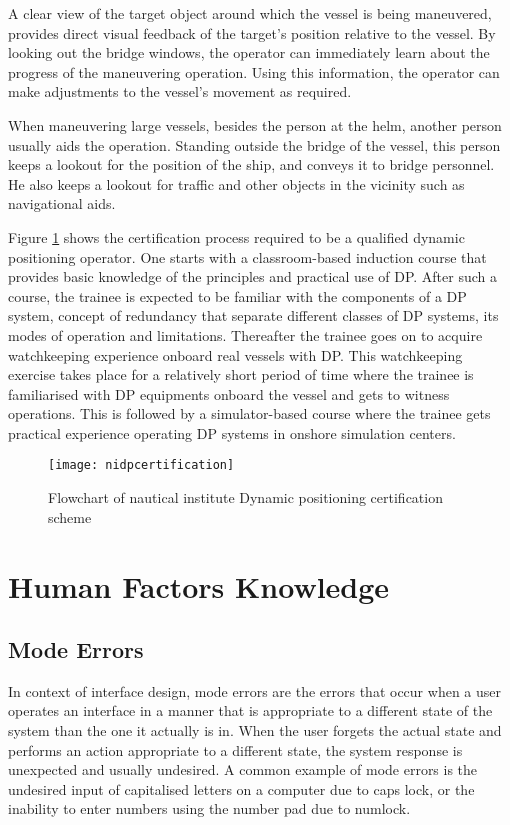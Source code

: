A clear view of the target object around which the vessel is being maneuvered, provides direct visual feedback of the target’s position relative to the vessel. By looking out the bridge windows, the operator can immediately learn about the progress of the maneuvering operation. Using this information, the operator can make adjustments to the vessel's movement as required.

When maneuvering large vessels, besides the person at the helm, another person usually aids the operation. Standing outside the bridge of the vessel, this person keeps a lookout for the position of the ship, and conveys it to bridge personnel. He also keeps a lookout for traffic and other objects in the vicinity such as navigational aids.

Figure \ref{fig:nidpcertification} shows the certification process required to be a qualified dynamic positioning operator. One starts with a classroom-based induction course that provides basic knowledge of the principles and practical use of DP. After such a course, the trainee is expected to be familiar with the components of a DP system, concept of redundancy that separate different classes of DP systems, its modes of operation and limitations. Thereafter the trainee goes on to acquire watchkeeping experience onboard real vessels with DP. This watchkeeping exercise takes place for a relatively short period of time where the trainee is familiarised with DP equipments onboard the vessel and gets to witness operations. This is followed by a simulator-based course where the trainee gets practical experience operating DP systems in onshore simulation centers. 

\begin{figure}
	\centering
	\texttt{[image: nidpcertification]}
	\caption{Flowchart of nautical institute Dynamic positioning certification scheme}
	\label{fig:nidpcertification}
\end{figure} 

\section{Human Factors Knowledge}
\label{sec:humanfactors}
\subsection{Mode Errors}
In context of interface design, mode errors are the errors that occur when a user operates an interface in a manner that is appropriate to a different state of the system than the one it actually is in. When the user forgets the actual state and performs an action appropriate to a different state, the system response is unexpected and usually undesired. A common example of mode errors is the undesired input of capitalised letters on a computer due to caps lock, or the inability to enter numbers using the number pad due to numlock. 

